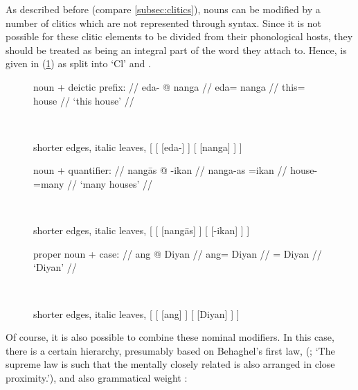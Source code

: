 As described before (compare \autoref{subsec:clitics}), nouns can be modified
by a number of clitics which are not represented through syntax. Since it is
not possible for these clitic elements to be divided from their phonological
hosts, they should be treated as being an integral part of the word they attach
to. Hence,  is given in (\ref{ex:nouncltree}) as split into `Cl' and
.

\begin{figure}
\pex\label{ex:nouncltree}
\a %
	\begin{minipage}[t]{.5\remaining}
	\begingl
		\glpreamble noun + deictic prefix: //
		\gla eda- @ nanga //
		\glb eda= nanga //
		\glc this= house //
		\glft `this house' //
	\endgl
	\end{minipage}
	~
	\begin{forest} shorter edges, italic leaves,
	[
		[
			[eda-]
		]
		[
			[nanga]
		]
	]
	\end{forest}

\a %
	\begin{minipage}[t]{.5\remaining}
	\begingl
		\glpreamble noun + quantifier: //
		\gla nangās @ -ikan //
		\glb nanga-as =ikan //
		\glc house-\Parg{} =many //
		\glft `many houses' //
	\endgl
	\end{minipage}
	~
	\begin{forest} shorter edges, italic leaves,
	[
		[
			[nangās]
		]
		[
			[-ikan]
		]
	]
	\end{forest}

\a %
	\begin{minipage}[t]{.5\remaining}
	\begingl
		\glpreamble proper noun + case: //
		\gla ang @ Diyan //
		\glb ang= Diyan //
		\glc \Aarg{}= Diyan //
		\glft `Diyan' //
	\endgl
	\end{minipage}
	~
	\begin{forest} shorter edges, italic leaves,
	[
		[
			[ang]
		]
		[
			[Diyan]
		]
	]
	\end{forest}

\xe
\end{figure}

Of course, it is also possible to combine these nominal modifiers. In this
case, there is a certain hierarchy, presumably based on Behaghel's first law,
 (\cite[4]{behaghel1932}; `The supreme law is
such that the mentally closely related is also arranged in close proximity.'), 
and also grammatical weight \citep{wasow1997}:

